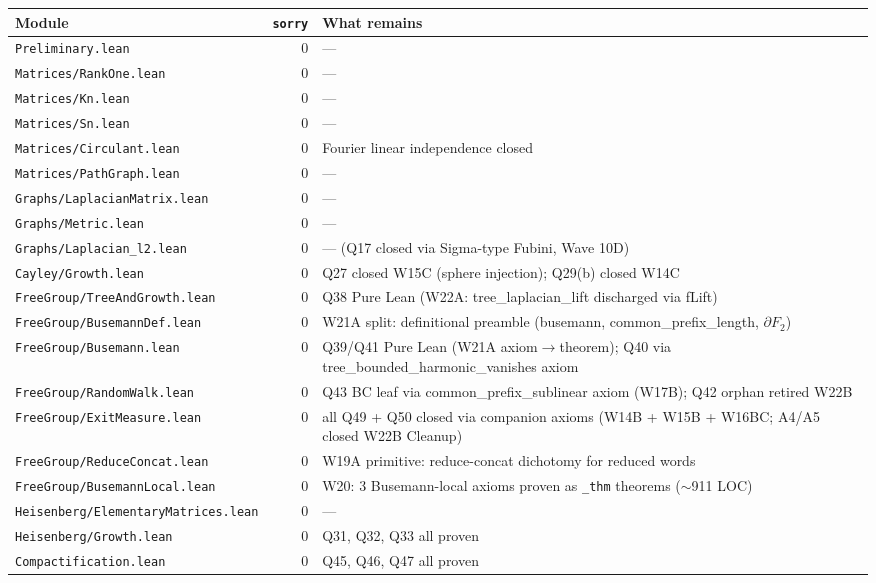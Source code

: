 \documentclass[11pt,a4paper]{article}
\newcommand{\cmd}[1]{\texttt{\small #1}}
\newcommand{\lmod}[1]{\texttt{\small #1}}
\theoremstyle{plain}
\theoremstyle{definition}
\begin{document}
\begin{center}
\renewcommand{\arraystretch}{1.15}
\begin{tabular}{lrl}
\toprule
\textbf{Module} & \textbf{\cmd{sorry}} & \textbf{What remains} \\
\midrule
\lmod{Preliminary.lean}                 & 0 & --- \\
\lmod{Matrices/RankOne.lean}            & 0 & --- \\
\lmod{Matrices/Kn.lean}                 & 0 & --- \\
\lmod{Matrices/Sn.lean}                 & 0 & --- \\
\lmod{Matrices/Circulant.lean}          & 0 & Fourier linear independence closed \\
\lmod{Matrices/PathGraph.lean}          & 0 & --- \\
\lmod{Graphs/LaplacianMatrix.lean}      & 0 & --- \\
\lmod{Graphs/Metric.lean}               & 0 & --- \\
\lmod{Graphs/Laplacian\_l2.lean}         & 0 & --- (Q17 closed via Sigma-type Fubini, Wave 10D) \\
\lmod{Cayley/Growth.lean}               & 0 & Q27 closed W15C (sphere injection); Q29(b) closed W14C \\
\lmod{FreeGroup/TreeAndGrowth.lean}     & 0 & Q38 Pure Lean (W22A: tree\_laplacian\_lift discharged via fLift) \\
\lmod{FreeGroup/BusemannDef.lean}       & 0 & W21A split: definitional preamble (busemann, common\_prefix\_length, $\partial F_2$) \\
\lmod{FreeGroup/Busemann.lean}          & 0 & Q39/Q41 Pure Lean (W21A axiom$\to$theorem); Q40 via tree\_bounded\_harmonic\_vanishes axiom \\
\lmod{FreeGroup/RandomWalk.lean}        & 0 & Q43 BC leaf via common\_prefix\_sublinear axiom (W17B); Q42 orphan retired W22B \\
\lmod{FreeGroup/ExitMeasure.lean}       & 0 & all Q49 + Q50 closed via companion axioms (W14B + W15B + W16BC; A4/A5 closed W22B Cleanup) \\
\lmod{FreeGroup/ReduceConcat.lean}      & 0 & W19A primitive: reduce-concat dichotomy for reduced words \\
\lmod{FreeGroup/BusemannLocal.lean}     & 0 & W20: 3 Busemann-local axioms proven as \texttt{\_thm} theorems ($\sim$911 LOC) \\
\lmod{Heisenberg/ElementaryMatrices.lean}& 0 & --- \\
\lmod{Heisenberg/Growth.lean}           & 0 & Q31, Q32, Q33 all proven \\
\lmod{Compactification.lean}            & 0 & Q45, Q46, Q47 all proven \\
\bottomrule
\end{tabular}
\end{center}
\end{document}
